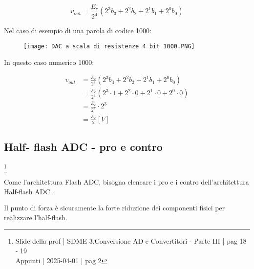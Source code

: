 {
    \Large 
    \begin{equation}
        v_{out} 
        = 
        \frac{E_c}{2^{4}}
        \left( 
            2^{3} b_3 
            +
            2^{2} b_2
            +
            2^{1} b_1
            +
            2^{0} b_0
        \right)
    \end{equation}
}

Nel caso di esempio di una parola di codice 1000: 

\begin{figure}[h]
    \centering
    \texttt{[image: DAC a scala di resistenze 4 bit 1000.PNG]}
\end{figure}

\newpage 

In questo caso numerico 1000: 

{
    \Large 
    \begin{equation}
        \begin{split}
        v_{out} 
        &= 
        \frac{E_c}{2^{4}}
        \left( 
            2^{3} b_3 
            +
            2^{2} b_2
            +
            2^{1} b_1
            +
            2^{0} b_0
        \right)
        \\ 
        &= 
        \frac{E_c}{2^{4}}
        \left( 
            2^{3} \cdot 1 
            +
            2^{2} \cdot 0
            +
            2^{1} \cdot 0
            +
            2^{0} \cdot 0
        \right)
        \\
        &= 
        \frac{E_c}{2^{4}} 
        \cdot
        2^{3}
        \\ 
        &= 
        \frac{E_c}{2} [V]
        \end{split}
    \end{equation}
}

\newpage 

\subsection{Half- flash ADC - pro e contro}
\footnote{Slide della prof | SDME 3.Conversione AD e Convertitori - Parte III | pag 18 - 19 \\  
Appunti | 2025-04-01 | pag 2 }

Come l'architettura Flash ADC, bisogna elencare i pro e i contro dell'architettura Half-flash ADC. \newline 

Il punto di forza è sicuramente la forte riduzione dei componenti fisici per realizzare l'half-flash. \newline 

